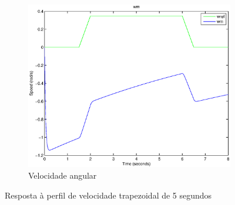 \documentclass{article}
\begin{document}
\begin{figure}[H]
\begin{subfigure}{0.45\textwidth}
		\includegraphics[width=\linewidth]{matlab/wm8}
		\caption{Velocidade angular}
	\end{subfigure}
	\caption{Resposta à perfil de velocidade trapezoidal de 5 segundos}	
	\label{fig:sim8res}
\end{figure}
\end{document}
